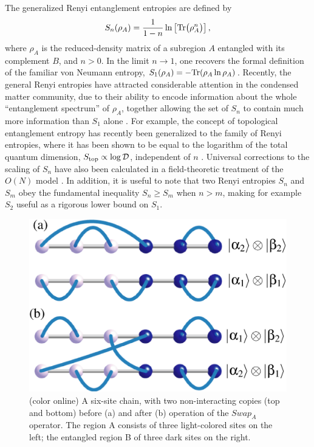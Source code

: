 \documentclass[prl,aps,twocolumn,floatfix,amsmath,amssymb,superscriptaddress,tightenlines]{revtex4}
\begin{document}
The generalized Renyi entanglement entropies are defined by
\begin{equation}
S_{n} (\rho_A) = \frac{1}{1- n} \ln \left[{ {\rm Tr}\big( \rho_A^{n} \big) }\right],
\label{Sn}
\end{equation}
where $\rho_A$ is the reduced-density matrix of a subregion $A$ entangled with its complement $B$, and 
$n>0$.  In the limit $n \rightarrow 1$, one recovers the formal 
definition of the familiar von Neumann entropy, $S_1 (\rho_A) = - {\rm Tr}( \rho_A \ln \rho_A )$.  
Recently, the general Renyi entropies have attracted considerable attention in the condensed matter community, due to their ability to encode
information about the whole ``entanglement spectrum'' of $\rho_A$, together allowing the set of $S_{n}$ to contain 
much more information than $S_1$ alone \cite{Espec}.  For example, the concept of topological entanglement entropy has recently been
generalized to the family of Renyi entropies, where it has been shown to be equal to the logarithm of the total quantum 
dimension, $S_{\rm top} \propto \log {\mathcal D}$, independent of $n$ \cite{PI}.  Universal corrections to the scaling of $S_{n}$ 
have also been calculated in a field-theoretic treatment of the $O(N)$ model \cite{Max}.
In addition, it is useful to note that two Renyi entropies $S_{n}$ and $S_{m}$ obey the fundamental
inequality $S_{n} \geq S_{m}$ when $n > m$, making for example $S_2$ useful as a rigorous
lower bound on $S_1$.  

\begin{figure} {
\includegraphics[width=2.5
in]{swap_2.eps} \caption{(color online) 
\label{swap_2}
A six-site chain, with two non-interacting copies (top and bottom) before (a) and after (b) operation of the $Swap_A$ operator.  
The region A consists of three light-colored sites on the left; the entangled region B of three dark sites on the right.
}
} \end{figure}
\end{document}
